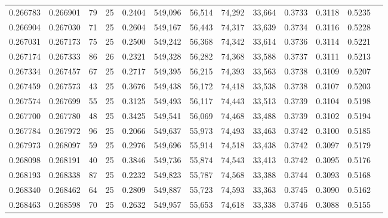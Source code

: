 \begin{tabular}{rrrrrrrrrrrrr}
0.266783 & 0.266901 &    79 &  25 &                                     0.2404 & 549,096 &  56,514 &  74,292 &  33,664 & 0.3733 & 0.3118 & 0.5235 \\
0.266904 & 0.267030 &    71 &  25 &                                     0.2604 & 549,167 &  56,443 &  74,317 &  33,639 & 0.3734 & 0.3116 & 0.5228 \\
0.267031 & 0.267173 &    75 &  25 &                                     0.2500 & 549,242 &  56,368 &  74,342 &  33,614 & 0.3736 & 0.3114 & 0.5221 \\
0.267174 & 0.267333 &    86 &  26 &                                     0.2321 & 549,328 &  56,282 &  74,368 &  33,588 & 0.3737 & 0.3111 & 0.5213 \\
0.267334 & 0.267457 &    67 &  25 &                                     0.2717 & 549,395 &  56,215 &  74,393 &  33,563 & 0.3738 & 0.3109 & 0.5207 \\
0.267459 & 0.267573 &    43 &  25 &                                     0.3676 & 549,438 &  56,172 &  74,418 &  33,538 & 0.3738 & 0.3107 & 0.5203 \\
0.267574 & 0.267699 &    55 &  25 &                                     0.3125 & 549,493 &  56,117 &  74,443 &  33,513 & 0.3739 & 0.3104 & 0.5198 \\
0.267700 & 0.267780 &    48 &  25 &                                     0.3425 & 549,541 &  56,069 &  74,468 &  33,488 & 0.3739 & 0.3102 & 0.5194 \\
0.267784 & 0.267972 &    96 &  25 &                                     0.2066 & 549,637 &  55,973 &  74,493 &  33,463 & 0.3742 & 0.3100 & 0.5185 \\
0.267973 & 0.268097 &    59 &  25 &                                     0.2976 & 549,696 &  55,914 &  74,518 &  33,438 & 0.3742 & 0.3097 & 0.5179 \\
0.268098 & 0.268191 &    40 &  25 &                                     0.3846 & 549,736 &  55,874 &  74,543 &  33,413 & 0.3742 & 0.3095 & 0.5176 \\
0.268193 & 0.268338 &    87 &  25 &                                     0.2232 & 549,823 &  55,787 &  74,568 &  33,388 & 0.3744 & 0.3093 & 0.5168 \\
0.268340 & 0.268462 &    64 &  25 &                                     0.2809 & 549,887 &  55,723 &  74,593 &  33,363 & 0.3745 & 0.3090 & 0.5162 \\
0.268463 & 0.268598 &    70 &  25 &                                     0.2632 & 549,957 &  55,653 &  74,618 &  33,338 & 0.3746 & 0.3088 & 0.5155 \\

\end{tabular}
